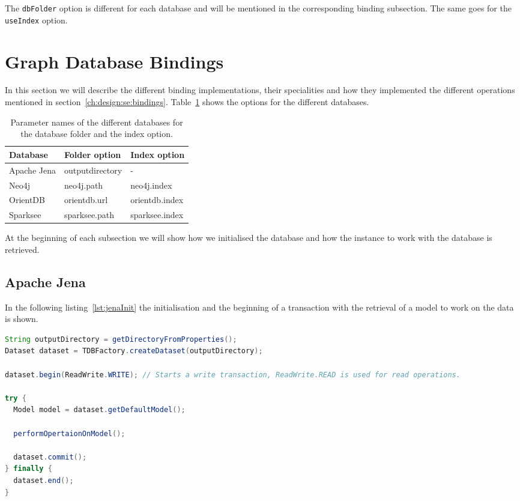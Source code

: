 The \texttt{dbFolder} option is different for each database and will be mentioned in the corresponding binding subsection.
The same goes for the \texttt{useIndex} option.

\section{Graph Database Bindings}
\label{ch:implementation:se:graphDatabaseBindings}
In this section we will describe the different binding implementations, their specialities and how they implemented the different operations mentioned in section~\ref{ch:design:se:bindings}.
Table~\ref{tab:bindingParameterMapping} shows the options for the different databases.

\begin{table}
  \begin{minipage}{\textwidth}
    \begin{tabularx}{\textwidth}{ | X | X | X | }
      \hline
      Database & Folder option & Index option \\ \hline \hline
      Apache Jena & outputdirectory & - \\ \hline
      Neo4j & neo4j.path & neo4j.index \\ \hline
      OrientDB & orientdb.url & orientdb.index \\ \hline
      Sparksee & sparksee.path & sparksee.index \\ \hline
    \end{tabularx}
  \end{minipage}
  \caption{Parameter names of the different databases for the database folder and the index option.}
  \label{tab:bindingParameterMapping}
\end{table}

At the beginning of each subsection we will show how we initialised the database and how the instance to work with the database is retrieved.

\subsection{Apache Jena}
In the following listing~\ref{lst:jenaInit} the initialisation and the beginning of a transaction with the retrieval of a model to work on the data is shown.

\begin{lstlisting}[language=Java,label={lst:jenaInit},caption={Implementation of the initialisation and model retrieval in Jena.},captionpos=b]
String outputDirectory = getDirectoryFromProperties();
Dataset dataset = TDBFactory.createDataset(outputDirectory);

dataset.begin(ReadWrite.WRITE); // Starts a write transaction, ReadWrite.READ is used for read operations.

try {
  Model model = dataset.getDefaultModel();

  performOpertaionOnModel();

  dataset.commit();
} finally {
  dataset.end();
}
\end{lstlisting}

